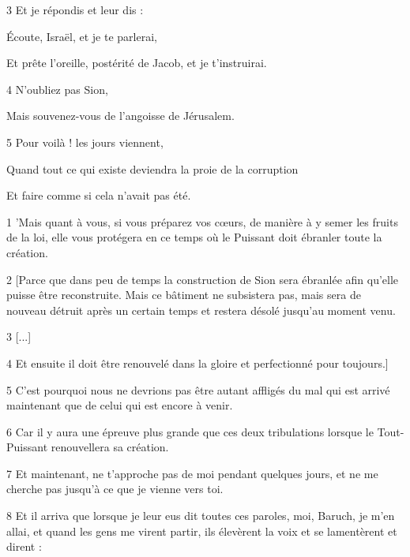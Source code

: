 \par 3 Et je répondis et leur dis :

\par Écoute, Israël, et je te parlerai,

\par Et prête l'oreille, postérité de Jacob, et je t'instruirai.

\par 4 N'oubliez pas Sion,

\par Mais souvenez-vous de l'angoisse de Jérusalem.

\par 5 Pour voilà ! les jours viennent,

\par Quand tout ce qui existe deviendra la proie de la corruption

\par Et faire comme si cela n'avait pas été.


\par 1 'Mais quant à vous, si vous préparez vos cœurs, de manière à y semer les fruits de la loi, elle vous protégera en ce temps où le Puissant doit ébranler toute la création.

\par 2 [Parce que dans peu de temps la construction de Sion sera ébranlée afin qu'elle puisse être reconstruite. Mais ce bâtiment ne subsistera pas, mais sera de nouveau détruit après un certain temps et restera désolé jusqu'au moment venu.

\par 3 [...]

\par 4 Et ensuite il doit être renouvelé dans la gloire et perfectionné pour toujours.]

\par 5 C'est pourquoi nous ne devrions pas être autant affligés du mal qui est arrivé maintenant que de celui qui est encore à venir.

\par 6 Car il y aura une épreuve plus grande que ces deux tribulations lorsque le Tout-Puissant renouvellera sa création.

\par 7 Et maintenant, ne t'approche pas de moi pendant quelques jours, et ne me cherche pas jusqu'à ce que je vienne vers toi.

\par 8 Et il arriva que lorsque je leur eus dit toutes ces paroles, moi, Baruch, je m'en allai, et quand les gens me virent partir, ils élevèrent la voix et se lamentèrent et dirent :

